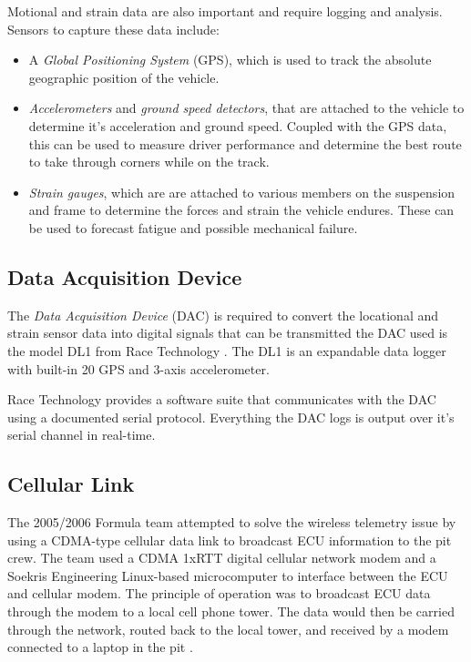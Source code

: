 Motional and strain data are also important and require logging and analysis. Sensors to capture these data include:

\begin{itemize}

\item A \emph{Global Positioning System} (GPS), which is used to track the absolute geographic position of the vehicle. 

\item \emph{Accelerometers} and \emph{ground speed detectors}, that are attached to the vehicle to determine it's acceleration and ground speed. Coupled with the GPS data, this can be used to measure driver performance and determine the best route to take through corners while on the track.

\item \emph{Strain gauges}, which are are attached to various members on the suspension and frame to determine the forces and strain the vehicle endures. These can be used to forecast fatigue and possible mechanical failure. 

\end{itemize}

\subsection{Data Acquisition Device}

The \emph{Data Acquisition Device} (DAC) is required to convert the locational and strain sensor data into digital signals that can be transmitted  the DAC used is the model DL1 from Race Technology \cite{DL1Dsheet}. The DL1 is an expandable data logger with built-in \unit{20}{\hertz} GPS and 3-axis accelerometer. 

Race Technology provides a software suite that communicates with the DAC using a documented serial protocol. Everything the DAC logs is output over it's serial channel in real-time.

\subsection{Cellular Link}

The 2005/2006 Formula team attempted to solve the wireless telemetry issue by using a CDMA-type cellular data link to broadcast ECU information to the pit crew. The team used a CDMA 1xRTT digital cellular network modem and a Soekris Engineering Linux-based microcomputer to interface between the ECU and cellular modem. The principle of operation was to broadcast ECU data through the modem to a local cell phone tower. The data would then be carried through the network, routed back to the local tower, and received by a modem connected to a laptop in the pit \cite{G26FinalRepo}.

